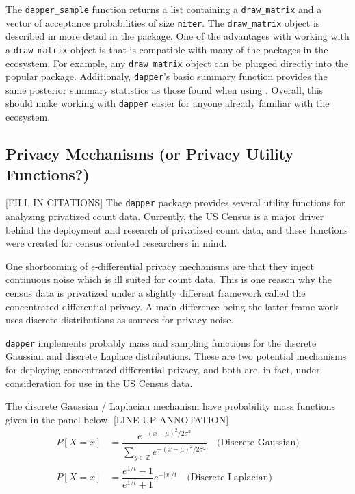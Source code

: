 The \texttt{dapper\_sample} function returns a list containing
a \texttt{draw\_matrix} and a vector of acceptance probabilities of size \texttt{niter}. The \texttt{draw\_matrix} object is described
in more detail in the  package. One of the advantages with working
with a \texttt{draw\_matrix} object is that is compatible with many of the packages in
the  ecosystem. For example, any \texttt{draw\_matrix} object can be
plugged directly into the popular  package. Additionaly,
\texttt{dapper}'s basic summary function provides the same posterior summary statistics
as those found when using . Overall, this should make working with \texttt{dapper} easier
for anyone already familiar with the  ecosystem.

\hypertarget{privacy-mechanisms-or-privacy-utility-functions}{%
\subsection{Privacy Mechanisms (or Privacy Utility Functions?)}\label{privacy-mechanisms-or-privacy-utility-functions}}

{[}FILL IN CITATIONS{]}
The \texttt{dapper} package provides several utility functions
for analyzing privatized count data. Currently, the US Census
is a major driver behind the deployment and research of privatized
count data, and these functions were created for census oriented
researchers in mind.

One shortcoming of \(\epsilon\)-differential privacy mechanisms
are that they inject continuous noise which is ill suited
for count data. This is one reason why the census data is privatized
under a slightly different framework called the concentrated differential privacy.
A main difference being the latter frame work uses discrete distributions as sources for privacy noise.

\texttt{dapper} implements probably mass and sampling functions
for the discrete Gaussian and discrete Laplace distributions. These
are two potential mechanisms for deploying concentrated differential privacy,
and both are, in fact, under consideration for use in the US Census data.

The discrete Gaussian / Laplacian mechanism have probability mass functions given in the
panel below.
{[}LINE UP ANNOTATION{]}
\[
\begin{aligned}
P[X = x] &= \dfrac{e^{-(x - \mu)^2/2\sigma^2}}{\sum_{y \in \mathbb{Z}} e^{-(x-\mu)^2/2\sigma^2}} \quad \text{(Discrete Gaussian)}\\
P[X = x] &= \dfrac{e^{1/t} - 1}{e^{1/t} + 1} e^{-|x|/t} \quad \text{(Discrete Laplacian)}
\end{aligned}
\]

